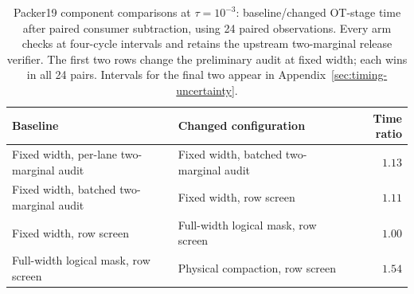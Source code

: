 \begin{table}[!t]
\centering
\caption{Packer19 component comparisons at $\tau=10^{-3}$: baseline/changed OT-stage time after paired consumer subtraction, using 24 paired observations. Every arm checks at four-cycle intervals and retains the upstream two-marginal release verifier. The first two rows change the preliminary audit at fixed width; each wins in all 24 pairs. Intervals for the final two appear in Appendix~\ref{sec:timing-uncertainty}.}
\label{tab:packer19-components}
\footnotesize
\setlength{\tabcolsep}{4pt}
\renewcommand{\arraystretch}{1.15}
\begin{tabular}{@{}p{}p{}r@{}}
\toprule
Baseline & Changed configuration & Time ratio \\
\midrule
Fixed width, per-lane two-marginal audit & Fixed width, batched two-marginal audit & $1.13$ \\
Fixed width, batched two-marginal audit & Fixed width, row screen & $1.11$ \\
Fixed width, row screen & Full-width logical mask, row screen & $1.00$ \\
Full-width logical mask, row screen & Physical compaction, row screen & $1.54$ \\
\bottomrule
\end{tabular}
\end{table}
